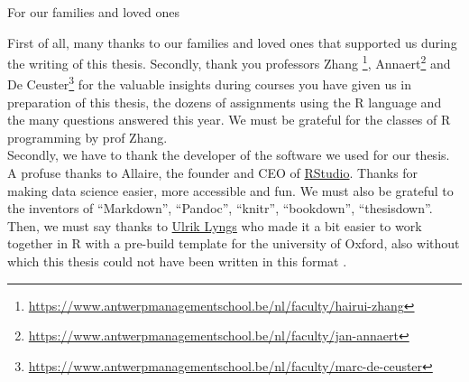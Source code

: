 \documentclass[a4paper, twoside]{templates/ociamthesis}
\begin{document}
\setcounter{secnumdepth}{2}
\setcounter{tocdepth}{2}



\begin{romanpages}

\maketitle

\begin{dedication}
  For our families and loved ones
\end{dedication}

\begin{acknowledgements}
 	First of all, many thanks to our families and loved ones that supported us during the writing of this thesis. Secondly, thank you professors Zhang \footnote{\url{https://www.antwerpmanagementschool.be/nl/faculty/hairui-zhang}}, Annaert\footnote{\url{https://www.antwerpmanagementschool.be/nl/faculty/jan-annaert}} and De Ceuster\footnote{\url{https://www.antwerpmanagementschool.be/nl/faculty/marc-de-ceuster}} for the valuable insights during courses you have given us in preparation of this thesis, the dozens of assignments using the R language and the many questions answered this year. We must be grateful for the classes of R programming by prof Zhang. ~\\

  \noindent Secondly, we have to thank the developer of the software we used for our thesis. A profuse thanks to Allaire, the founder and CEO of \href{http://rstudio.com}{RStudio}. Thanks for making data science easier, more accessible and fun. We must also be grateful to the inventors of ``Markdown'', ``Pandoc'', ``knitr'', ``bookdown'', ``thesisdown''. Then, we must say thanks to \href{https://www.cs.ox.ac.uk/people/ulrik.lyngs/}{Ulrik Lyngs} who made it a bit easier to work together in R with a pre-build template for the university of Oxford, also without which this thesis could not have been written in this format \autocite{lyngsOxforddown2019}. ~\\


\end{acknowledgements}
\end{romanpages}
\end{document}
